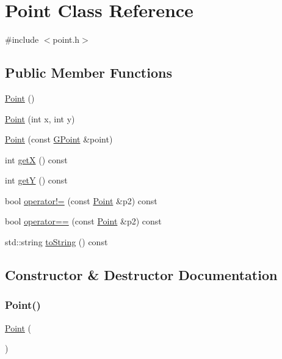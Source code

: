 \hypertarget{classPoint}{}\section{Point Class Reference}
\label{classPoint}


{\ttfamily \#include $<$point.\+h$>$}

\subsection*{Public Member Functions}
\begin{DoxyCompactItemize}
\item 
\mbox{\hyperlink{classPoint_ae08c5f0c5b4c75a3e0f33dada5f2fcba}{Point}} ()
\item 
\mbox{\hyperlink{classPoint_a6773b78ca9523d4d482ac886b41a1bfc}{Point}} (int x, int y)
\item 
\mbox{\hyperlink{classPoint_af5c561032606b32861e8ebdc949397ad}{Point}} (const \mbox{\hyperlink{classGPoint}{G\+Point}} \&point)
\item 
int \mbox{\hyperlink{classPoint_ae6902baa2934561358fc7f8f3852d4f6}{getX}} () const
\item 
int \mbox{\hyperlink{classPoint_afaf0a0403410a186997c1477e8bf6897}{getY}} () const
\item 
bool \mbox{\hyperlink{classPoint_ad62a7cee20e8e65bdf44b395d3df3e1b}{operator!=}} (const \mbox{\hyperlink{classPoint}{Point}} \&p2) const
\item 
bool \mbox{\hyperlink{classPoint_a66555fdca04ab3b9217ba2ed259be2b9}{operator==}} (const \mbox{\hyperlink{classPoint}{Point}} \&p2) const
\item 
std\+::string \mbox{\hyperlink{classPoint_a1fe5121d6528fdea3f243321b3fa3a49}{to\+String}} () const
\end{DoxyCompactItemize}


\subsection{Constructor \& Destructor Documentation}
\mbox{\label{classPoint_ae08c5f0c5b4c75a3e0f33dada5f2fcba}} 
\subsubsection{\texorpdfstring{Point()}{Point()}\hspace{0.1cm}{\footnotesize\ttfamily [1/3]}}
{\footnotesize\ttfamily \mbox{\hyperlink{classPoint}{Point}} (\begin{DoxyParamCaption}{ }\end{DoxyParamCaption})}

